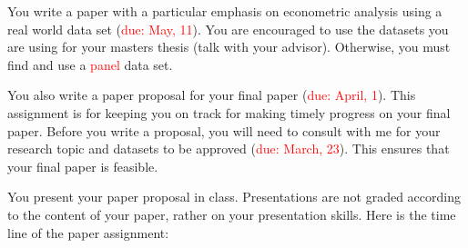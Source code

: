 \documentclass[12pt]{article}
\begin{document}
\begin{itemize}
	You write a paper with a particular emphasis on econometric analysis using a real world data set (\textcolor{red}{due: May, 11}). You are encouraged to use the datasets you are using for your masters thesis (talk with your advisor). Otherwise, you must find and use a \textcolor{red}{panel} data set. 

	You also write a paper proposal for your final paper (\textcolor{red}{due: April, 1}). This assignment is for keeping you on track for making timely progress on your final paper. Before you write a proposal, you will need to consult with me for your research topic and datasets to be approved (\textcolor{red}{due: March, 23}). This ensures that your final paper is feasible.  

	You present your paper proposal in class. Presentations are not graded according to the content of your paper, rather on your presentation skills. Here is the time line of the paper assignment:

\end{itemize}

\vspace*{.15in}

\clearpage
\end{document}
